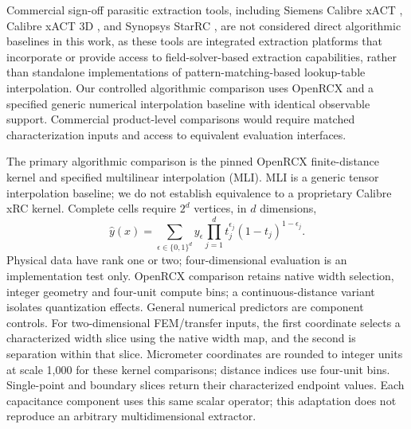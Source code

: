 \documentclass[conference,9pt,letterpaper]{IEEEtran}
\begin{document}
Commercial sign-off parasitic extraction tools, including
Siemens Calibre xACT \cite{siemens_calibre_xact}, Calibre xACT 3D \cite{siemens_calibre_xact3d}, and Synopsys StarRC \cite{synopsys_starrc},
are not considered direct algorithmic baselines in this work, as these tools are integrated extraction platforms that incorporate or provide access to field-solver-based extraction capabilities, rather than standalone implementations of pattern-matching-based lookup-table interpolation.
Our controlled algorithmic comparison uses OpenRCX \cite{openroad_openrcx} and a specified generic numerical interpolation baseline with identical observable support. Commercial product-level comparisons would require matched characterization inputs and access to equivalent evaluation interfaces.

The primary algorithmic comparison is the pinned OpenRCX finite-distance kernel and specified multilinear interpolation (MLI). MLI is a generic tensor interpolation baseline; we do not establish equivalence to a proprietary Calibre xRC kernel. %
Complete cells require $2^d$ vertices, in $d$ dimensions,
\begin{equation}
\widehat y(x)=\sum_{\epsilon\in\{0,1\}^d}y_\epsilon
 \prod_{j=1}^d t_j^{\epsilon_j}(1-t_j)^{1-\epsilon_j}.
\end{equation}
Physical data have rank one or two; four-dimensional evaluation is an implementation test only. OpenRCX comparison retains native width selection, integer geometry and four-unit compute bins; a continuous-distance variant isolates quantization effects. General numerical predictors are component controls.
For two-dimensional FEM/transfer inputs, the first coordinate selects a
characterized width slice using the native width map, and the second is
separation within that slice. Micrometer coordinates are rounded to integer
units at scale 1,000 for these kernel comparisons; distance indices use
four-unit bins. Single-point and boundary slices return their characterized
endpoint values. Each capacitance component uses this same scalar operator;
this adaptation does not reproduce an arbitrary multidimensional extractor.
\end{document}
